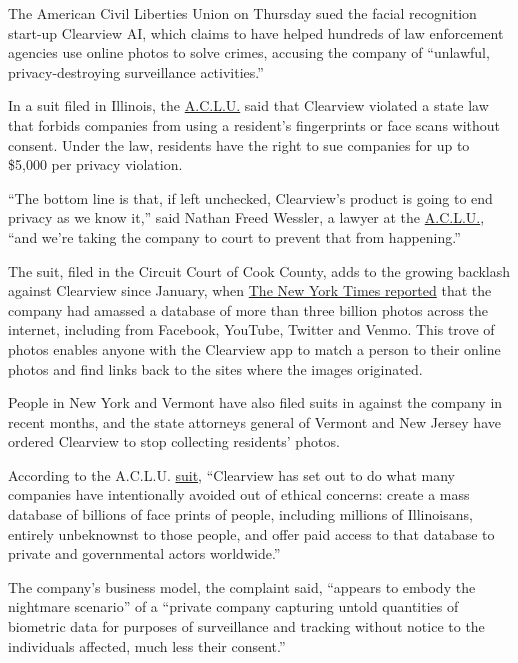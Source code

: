 The American Civil Liberties Union on Thursday sued the facial
recognition start-up Clearview AI, which claims to have helped hundreds
of law enforcement agencies use online photos to solve crimes, accusing
the company of ``unlawful, privacy-destroying surveillance activities.''

In a suit filed in Illinois, the
\href{https://www.nytimes3xbfgragh.onion/2020/06/03/business/aclu-sues-police-minneapolis.html}{A.C.L.U.}
said that Clearview violated a state law that forbids companies from
using a resident's fingerprints or face scans without consent. Under the
law, residents have the right to sue companies for up to \$5,000 per
privacy violation.

``The bottom line is that, if left unchecked, Clearview's product is
going to end privacy as we know it,'' said Nathan Freed Wessler, a
lawyer at the
\href{https://www.nytimes3xbfgragh.onion/2020/06/03/business/aclu-sues-police-minneapolis.html}{A.C.L.U.},
``and we're taking the company to court to prevent that from
happening.''

The suit, filed in the Circuit Court of Cook County, adds to the growing
backlash against Clearview since January, when
\href{https://www.nytimes3xbfgragh.onion/2020/01/18/technology/clearview-privacy-facial-recognition.html}{The
New York Times reported} that the company had amassed a database of more
than three billion photos across the internet, including from Facebook,
YouTube, Twitter and Venmo. This trove of photos enables anyone with the
Clearview app to match a person to their online photos and find links
back to the sites where the images originated.

People in New York and Vermont have also filed suits in against the
company in recent months, and the state attorneys general of Vermont and
New Jersey have ordered Clearview to stop collecting residents' photos.

According to the A.C.L.U.
\href{https://www.aclu.org/legal-document/aclu-v-clearview-ai-complaint}{suit},
``Clearview has set out to do what many companies have intentionally
avoided out of ethical concerns: create a mass database of billions of
face prints of people, including millions of Illinoisans, entirely
unbeknownst to those people, and offer paid access to that database to
private and governmental actors worldwide.''

The company's business model, the complaint said, ``appears to embody
the nightmare scenario'' of a ``private company capturing untold
quantities of biometric data for purposes of surveillance and tracking
without notice to the individuals affected, much less their consent.''

